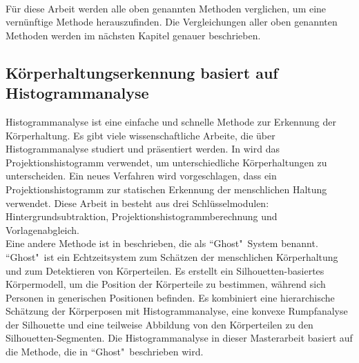 \\
Für diese Arbeit werden alle oben genannten Methoden verglichen, um eine vernünftige Methode herauszufinden. Die Vergleichungen aller oben genannten Methoden werden im nächsten Kapitel genauer beschrieben.\\
\subsection{Körperhaltungserkennung basiert auf Histogrammanalyse}
Histogrammanalyse ist eine einfache und schnelle Methode zur Erkennung der Körperhaltung. Es gibt viele wissenschaftliche Arbeite, die über Histogrammanalyse studiert und präsentiert werden. In\cite{guo2006projection} wird das Projektionshistogramm verwendet, um unterschiedliche Körperhaltungen zu unterscheiden. Ein neues Verfahren wird vorgeschlagen, dass ein Projektionshistogramm zur statischen Erkennung der menschlichen Haltung verwendet. Diese Arbeit in  \cite{guo2006projection} besteht aus drei Schlüsselmodulen: Hintergrundsubtraktion, Projektionshistogrammberechnung und Vorlagenabgleich.
\\
Eine andere Methode ist in \cite{haritaoglu1998ghost} beschrieben, die als ``Ghost"\ System benannt. ``Ghost"\ ist ein Echtzeitsystem zum Schätzen der menschlichen Körperhaltung und zum Detektieren von Körperteilen. Es erstellt ein Silhouetten-basiertes Körpermodell, um die Position der Körperteile zu bestimmen, während sich Personen in generischen Positionen befinden. Es kombiniert eine hierarchische Schätzung der Körperposen mit Histogrammanalyse, eine konvexe Rumpfanalyse der Silhouette und eine teilweise Abbildung von den Körperteilen zu den Silhouetten-Segmenten. Die Histogrammanalyse in dieser Masterarbeit basiert auf die Methode, die in ``Ghost"\ beschrieben wird.

 
